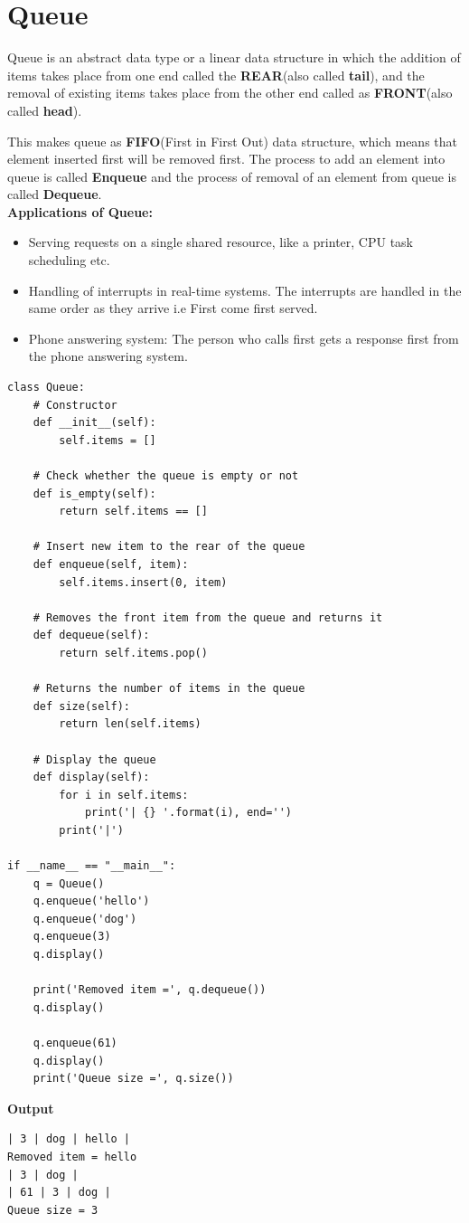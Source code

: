 \documentclass[a4paper,11pt]{book}
\begin{document}
\newpage
\section{Queue}
\noindent Queue is an abstract data type or a linear data structure in which the addition of items takes place from one end called the \textbf{REAR}(also called \textbf{tail}), and the removal of existing items takes place from the other end called as \textbf{FRONT}(also called \textbf{head}).

\noindent This makes queue as \textbf{FIFO}(First in First Out) data structure, which means that element inserted first will be removed first.
The process to add an element into queue is called \textbf{Enqueue} and the process of removal of an element from queue is called \textbf{Dequeue}.\\

\textbf{Applications of Queue:}
\begin{itemize}
	\item Serving requests on a single shared resource, like a printer, CPU task scheduling etc.
	\item Handling of interrupts in real-time systems. The interrupts are handled in the same order as they arrive i.e First come first served.
	\item Phone answering system: The person who calls first gets a response first from the phone answering system.
\end{itemize}

\begin{lstlisting}
class Queue:
    # Constructor
    def __init__(self):
        self.items = []
        
    # Check whether the queue is empty or not
    def is_empty(self):
        return self.items == []
    
    # Insert new item to the rear of the queue
    def enqueue(self, item):
        self.items.insert(0, item)
        
    # Removes the front item from the queue and returns it
    def dequeue(self):
        return self.items.pop()
    
    # Returns the number of items in the queue
    def size(self):
        return len(self.items)
    
    # Display the queue
    def display(self):
        for i in self.items:
            print('| {} '.format(i), end='')
        print('|')
        
if __name__ == "__main__":
    q = Queue()
    q.enqueue('hello')
    q.enqueue('dog')
    q.enqueue(3)
    q.display()

    print('Removed item =', q.dequeue())
    q.display()

    q.enqueue(61)
    q.display()
    print('Queue size =', q.size())
\end{lstlisting}
\textbf{Output}
\begin{lstlisting}
| 3 | dog | hello |
Removed item = hello
| 3 | dog |
| 61 | 3 | dog |
Queue size = 3
\end{lstlisting}
\end{document}
